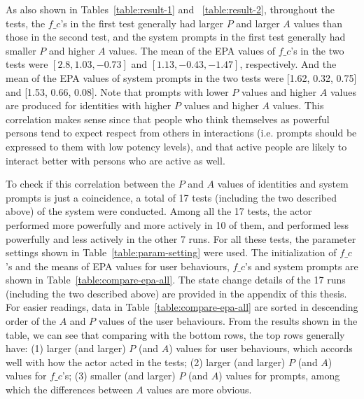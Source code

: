As also shown in Tables~\ref{table:result-1} and ~\ref{table:result-2}, throughout the tests, the $f\_c$'s in the first test generally had larger $P$ and larger $A$ values than those in the second test, and the system prompts in the first test generally had smaller $P$ and higher $A$ values. The mean of the EPA values of $f\_c$'s in the two tests were $[2.8, 1.03, -0.73]$ and $[1.13, -0.43, -1.47]$, respectively. And the mean of the EPA values of system prompts in the two tests were [1.62, 0.32, 0.75] and [1.53, 0.66, 0.08]. Note that prompts with lower $P$ values and higher $A$ values are produced for identities with higher $P$ values and higher $A$ values. This correlation makes sense since that people who think themselves as powerful persons tend to expect respect from others in interactions (i.e. prompts should be expressed to them with low potency levels), and that active people are likely to interact better with persons who are active as well. 

To check if this correlation between the $P$ and $A$ values of identities and system prompts is just a coincidence, a total of 17 tests (including the two described above) of the system were conducted. Among all the 17 tests, the actor performed more powerfully and more actively in 10 of them, and performed less powerfully and less actively in the other 7 runs. For all these tests, the parameter settings shown in Table~\ref{table:param-setting} were used. The initialization of $f\_c$'s and the means of EPA values for user behaviours, $f\_c$'s and system prompts are shown in Table~\ref{table:compare-epa-all}. The state change details of the 17 runs (including the two described above) are provided in the appendix of this thesis. For easier readings, data in Table~\ref{table:compare-epa-all} are sorted in descending order of the $A$ and $P$ values of the user behaviours. From the results shown in the table, we can see that comparing with the bottom rows, the top rows generally have:
(1) larger (and larger) $P$ (and $A$) values for user behaviours, which accords well with how the actor acted in the tests;
(2) larger (and larger) $P$ (and $A$) values for $f\_c$'s;
(3) smaller (and larger) $P$ (and $A$) values for prompts, among which the differences between $A$ values are more obvious.

